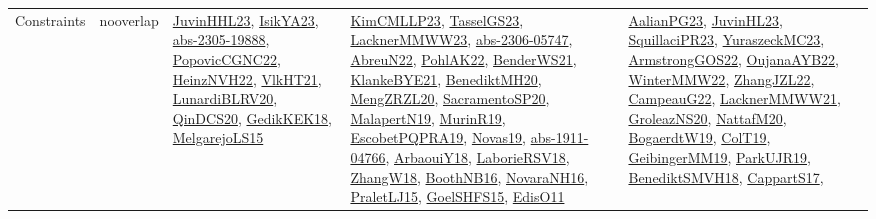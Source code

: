 {\begin{longtable}{lp{3cm}>{\raggedright}p{6cm}>{\raggedright}p{6cm}p{8cm}}
Constraints & nooverlap & \href{papers/JuvinHHL23.pdf}{JuvinHHL23}\cite{JuvinHHL23}, \href{articles/IsikYA23.pdf}{IsikYA23}\cite{IsikYA23}, \href{articles/abs-2305-19888.pdf}{abs-2305-19888}\cite{abs-2305-19888}, \href{papers/PopovicCGNC22.pdf}{PopovicCGNC22}\cite{PopovicCGNC22}, \href{articles/HeinzNVH22.pdf}{HeinzNVH22}\cite{HeinzNVH22}, \href{articles/VlkHT21.pdf}{VlkHT21}\cite{VlkHT21}, \href{articles/LunardiBLRV20.pdf}{LunardiBLRV20}\cite{LunardiBLRV20}, \href{articles/QinDCS20.pdf}{QinDCS20}\cite{QinDCS20}, \href{articles/GedikKEK18.pdf}{GedikKEK18}\cite{GedikKEK18}, \href{papers/MelgarejoLS15.pdf}{MelgarejoLS15}\cite{MelgarejoLS15} & \href{papers/KimCMLLP23.pdf}{KimCMLLP23}\cite{KimCMLLP23}, \href{papers/TasselGS23.pdf}{TasselGS23}\cite{TasselGS23}, \href{articles/LacknerMMWW23.pdf}{LacknerMMWW23}\cite{LacknerMMWW23}, \href{articles/abs-2306-05747.pdf}{abs-2306-05747}\cite{abs-2306-05747}, \href{articles/AbreuN22.pdf}{AbreuN22}\cite{AbreuN22}, \href{articles/PohlAK22.pdf}{PohlAK22}\cite{PohlAK22}, \href{papers/BenderWS21.pdf}{BenderWS21}\cite{BenderWS21}, \href{papers/KlankeBYE21.pdf}{KlankeBYE21}\cite{KlankeBYE21}, \href{articles/BenediktMH20.pdf}{BenediktMH20}\cite{BenediktMH20}, \href{articles/MengZRZL20.pdf}{MengZRZL20}\cite{MengZRZL20}, \href{articles/SacramentoSP20.pdf}{SacramentoSP20}\cite{SacramentoSP20}, \href{papers/MalapertN19.pdf}{MalapertN19}\cite{MalapertN19}, \href{papers/MurinR19.pdf}{MurinR19}\cite{MurinR19}, \href{articles/EscobetPQPRA19.pdf}{EscobetPQPRA19}\cite{EscobetPQPRA19}, \href{articles/Novas19.pdf}{Novas19}\cite{Novas19}, \href{articles/abs-1911-04766.pdf}{abs-1911-04766}\cite{abs-1911-04766}, \href{papers/ArbaouiY18.pdf}{ArbaouiY18}\cite{ArbaouiY18}, \href{articles/LaborieRSV18.pdf}{LaborieRSV18}\cite{LaborieRSV18}, \href{articles/ZhangW18.pdf}{ZhangW18}\cite{ZhangW18}, \href{papers/BoothNB16.pdf}{BoothNB16}\cite{BoothNB16}, \href{articles/NovaraNH16.pdf}{NovaraNH16}\cite{NovaraNH16}, \href{papers/PraletLJ15.pdf}{PraletLJ15}\cite{PraletLJ15}, \href{articles/GoelSHFS15.pdf}{GoelSHFS15}\cite{GoelSHFS15}, \href{papers/EdisO11.pdf}{EdisO11}\cite{EdisO11} & \href{papers/AalianPG23.pdf}{AalianPG23}\cite{AalianPG23}, \href{papers/JuvinHL23.pdf}{JuvinHL23}\cite{JuvinHL23}, \href{papers/SquillaciPR23.pdf}{SquillaciPR23}\cite{SquillaciPR23}, \href{papers/YuraszeckMC23.pdf}{YuraszeckMC23}\cite{YuraszeckMC23}, \href{papers/ArmstrongGOS22.pdf}{ArmstrongGOS22}\cite{ArmstrongGOS22}, \href{papers/OujanaAYB22.pdf}{OujanaAYB22}\cite{OujanaAYB22}, \href{papers/WinterMMW22.pdf}{WinterMMW22}\cite{WinterMMW22}, \href{papers/ZhangJZL22.pdf}{ZhangJZL22}\cite{ZhangJZL22}, \href{articles/CampeauG22.pdf}{CampeauG22}\cite{CampeauG22}, \href{papers/LacknerMMWW21.pdf}{LacknerMMWW21}\cite{LacknerMMWW21}, \href{papers/GroleazNS20.pdf}{GroleazNS20}\cite{GroleazNS20}, \href{papers/NattafM20.pdf}{NattafM20}\cite{NattafM20}, \href{papers/BogaerdtW19.pdf}{BogaerdtW19}\cite{BogaerdtW19}, \href{papers/ColT19.pdf}{ColT19}\cite{ColT19}, \href{papers/GeibingerMM19.pdf}{GeibingerMM19}\cite{GeibingerMM19}, \href{papers/ParkUJR19.pdf}{ParkUJR19}\cite{ParkUJR19}, \href{papers/BenediktSMVH18.pdf}{BenediktSMVH18}\cite{BenediktSMVH18}, \href{papers/CappartS17.pdf}{CappartS17}\cite{CappartS17}, 
\end{longtable}}
